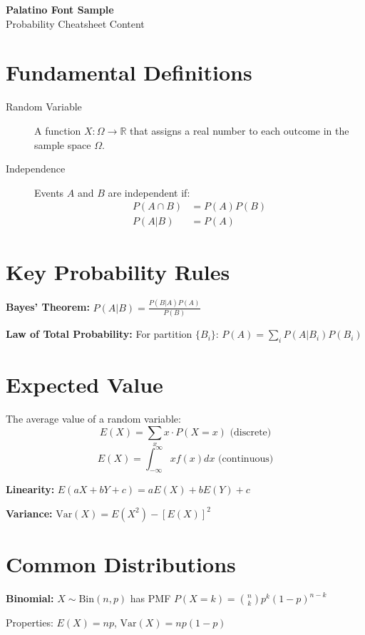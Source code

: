 \documentclass[10pt]{article}
\newcommand{\var}{\textrm{Var}}
\newcommand{\Bin}{\textrm{Bin}}
\begin{document}
\begin{center}
{\Large\bfseries Palatino Font Sample}\\
{\large Probability Cheatsheet Content}
\end{center}

\vspace{0.5cm}

\section{Fundamental Definitions}
\begin{description}
    \item[Random Variable] A function $X: \Omega \to \mathbb{R}$ that assigns a real number to each outcome in the sample space $\Omega$.
    \item[Independence] Events $A$ and $B$ are independent if:
    \begin{align*}
        P(A \cap B) &= P(A)P(B) \\
        P(A|B) &= P(A)
    \end{align*}
\end{description}

\section{Key Probability Rules}
\textbf{Bayes' Theorem:} $P(A|B) = \frac{P(B|A)P(A)}{P(B)}$

\textbf{Law of Total Probability:} For partition $\{B_i\}$: $P(A) = \sum_{i} P(A|B_i)P(B_i)$

\section{Expected Value}
The average value of a random variable:
\[E(X) = \sum_{x} x \cdot P(X = x) \text{ (discrete)}\]
\[E(X) = \int_{-\infty}^{\infty} x f(x) dx \text{ (continuous)}\]

\textbf{Linearity:} $E(aX + bY + c) = aE(X) + bE(Y) + c$

\textbf{Variance:} $\var(X) = E(X^2) - [E(X)]^2$

\section{Common Distributions}
\textbf{Binomial:} $X \sim \Bin(n, p)$ has PMF $P(X = k) = \binom{n}{k} p^k (1-p)^{n-k}$

Properties: $E(X) = np$, $\var(X) = np(1-p)$
\end{document}
